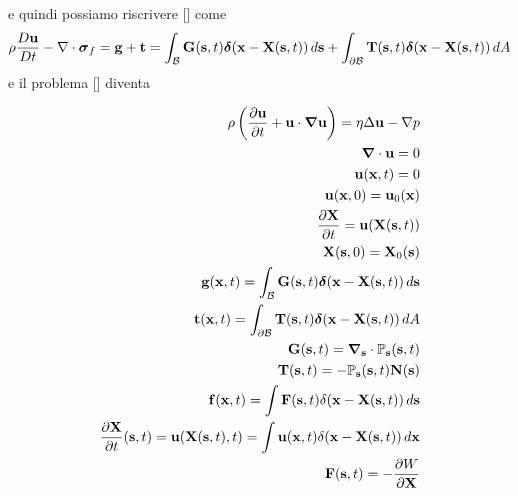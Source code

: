 e quindi possiamo riscrivere [] come
\begin{equation}
\rho\frac{D\mathbf{u}}{Dt}-\nabla\cdot\boldsymbol{\sigma}_f = \mathbf{g}+\mathbf{t} = \int_{\mathcal{B}}\mathbf{G}(\mathbf{s},t)\boldsymbol{\delta}(\mathbf{x}-\mathbf{X}(\mathbf{s},t))\,d\mathbf{s}+
\int_{\partial \mathcal{B}}\mathbf{T}(\mathbf{s},t)\boldsymbol{\delta}(\mathbf{x}-\mathbf{X}(\mathbf{s},t))\,dA
\end{equation}
e il problema [] diventa
\begin{problem}
	\begin{equation}
\begin{aligned}
	\rho \left ( \frac{\partial \mathbf{u}}{\partial t} + \mathbf{u} \cdot \boldsymbol{\nabla} \mathbf{u} \right ) = \eta \Delta \mathbf{u} - \nabla p \\
	\boldsymbol{\nabla} \cdot \mathbf{u} = 0 \\
	\mathbf{u}(\mathbf{x},t)=0 \\
	\mathbf{u}(\mathbf{x},0)=\mathbf{u}_0(\mathbf{x}) \\
	\frac{\partial \mathbf{X}}{\partial t} = \mathbf{u}(\mathbf{X}(\mathbf{s},t))\\
	\mathbf{X}(\mathbf{s},0)=\mathbf{X}_0(\mathbf{s})\\
		\mathbf{g}(\mathbf{x},t)=\int_{\mathcal{B}}\mathbf{G}(\mathbf{s},t)\boldsymbol{\delta}(\mathbf{x}-\mathbf{X}(\mathbf{s},t))\,d\mathbf{s}\\
	\mathbf{t}(\mathbf{x},t)=\int_{\partial \mathcal{B}}\mathbf{T}(\mathbf{s},t)\boldsymbol{\delta}(\mathbf{x}-\mathbf{X}(\mathbf{s},t))\,dA\\
		\mathbf{G}(\mathbf{s},t)=\boldsymbol{\nabla}_{\mathbf{s}}\cdot\mathbb{P}_{\mathbf{s}}(\mathbf{s},t)\\
			\mathbf{T}(\mathbf{s},t)=-\mathbb{P}_{\mathbf{s}}(\mathbf{s},t)\mathbf{N}(\mathbf{s})\\
	\mathbf{f}(\mathbf{x},t)=\int \mathbf{F}(\mathbf{s},t)\delta(\mathbf{x}-\mathbf{X}(\mathbf{s},t))\,d\mathbf{s}\\
	\frac{\partial\mathbf{X}}{\partial t}(\mathbf{s},t)=\mathbf{u}(\mathbf{X}(\mathbf{s},t),t)=\int \mathbf{u}(\mathbf{x},t)\delta(\mathbf{x}-\mathbf{X}(\mathbf{s},t))\,d\mathbf{x}\\
	\mathbf{F}(\mathbf{s},t)=-\frac{\partial W}{\partial \mathbf{X}}\\
\end{aligned}
\end{equation}
\end{problem}

